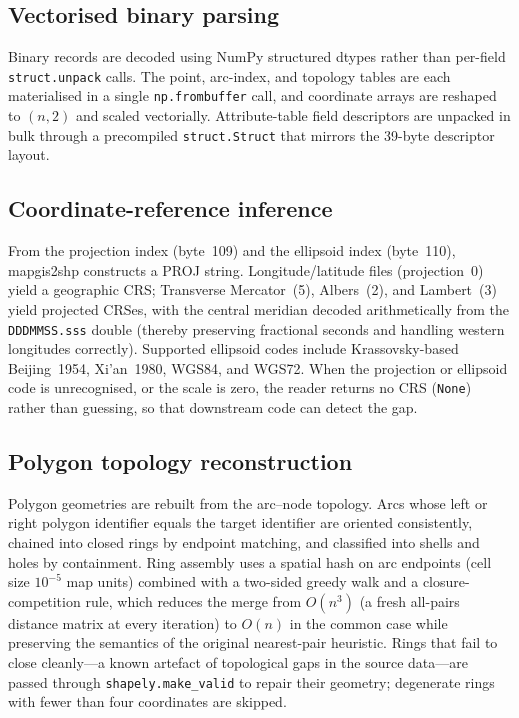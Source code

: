 \documentclass[11pt,a4paper]{article}
\begin{document}
\subsection{Vectorised binary parsing}
Binary records are decoded using NumPy structured dtypes rather than per-field \texttt{struct.unpack} calls. The point, arc-index, and topology tables are each materialised in a single \texttt{np.frombuffer} call, and coordinate arrays are reshaped to $(n,2)$ and scaled vectorially. Attribute-table field descriptors are unpacked in bulk through a precompiled \texttt{struct.Struct} that mirrors the 39-byte descriptor layout.

\subsection{Coordinate-reference inference}
From the projection index (byte~109) and the ellipsoid index (byte~110), mapgis2shp constructs a PROJ string. Longitude/latitude files (projection~0) yield a geographic CRS; Transverse Mercator~(5), Albers~(2), and Lambert~(3) yield projected CRSes, with the central meridian decoded arithmetically from the \texttt{DDDMMSS.sss} double (thereby preserving fractional seconds and handling western longitudes correctly). Supported ellipsoid codes include Krassovsky-based Beijing~1954, Xi'an~1980, WGS84, and WGS72. When the projection or ellipsoid code is unrecognised, or the scale is zero, the reader returns no CRS (\texttt{None}) rather than guessing, so that downstream code can detect the gap.

\subsection{Polygon topology reconstruction}
Polygon geometries are rebuilt from the arc--node topology. Arcs whose left or right polygon identifier equals the target identifier are oriented consistently, chained into closed rings by endpoint matching, and classified into shells and holes by containment. Ring assembly uses a spatial hash on arc endpoints (cell size $10^{-5}$ map units) combined with a two-sided greedy walk and a closure-competition rule, which reduces the merge from $O(n^{3})$ (a fresh all-pairs distance matrix at every iteration) to $O(n)$ in the common case while preserving the semantics of the original nearest-pair heuristic. Rings that fail to close cleanly---a known artefact of topological gaps in the source data---are passed through \texttt{shapely.make\_valid} to repair their geometry; degenerate rings with fewer than four coordinates are skipped.
\end{document}
